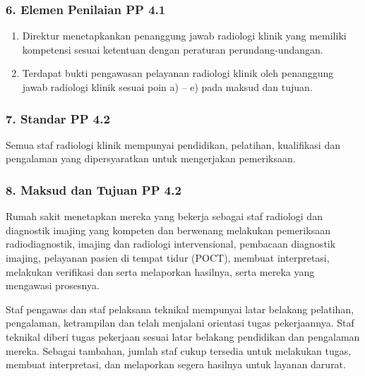 \documentclass[
]{book}
\providecommand{\tightlist}{%
  \setlength{\itemsep}{0pt}\setlength{\parskip}{0pt}}
\begin{document}
\hypertarget{elemen-penilaian-pp-4.1}{%
\subsubsection*{6. Elemen Penilaian PP 4.1}\label{elemen-penilaian-pp-4.1}}

\begin{enumerate}
\def\labelenumi{\alph{enumi}.}
\tightlist
\item
  Direktur menetapkankan penanggung jawab radiologi klinik yang memiliki kompetensi sesuai ketentuan dengan peraturan perundang-undangan.
\item
  Terdapat bukti pengawasan pelayanan radiologi klinik oleh penanggung jawab radiologi klinik sesuai poin a) -- e) pada maksud dan tujuan.
\end{enumerate}

\hypertarget{standar-pp-4.2}{%
\subsubsection*{7. Standar PP 4.2}\label{standar-pp-4.2}}

Semua staf radiologi klinik mempunyai pendidikan, pelatihan, kualifikasi dan pengalaman yang dipersyaratkan untuk mengerjakan pemeriksaan.

\hypertarget{maksud-dan-tujuan-pp-4.2}{%
\subsubsection*{8. Maksud dan Tujuan PP 4.2}\label{maksud-dan-tujuan-pp-4.2}}

Rumah sakit menetapkan mereka yang bekerja sebagai staf radiologi dan diagnostik imajing yang kompeten dan berwenang melakukan pemeriksaan radiodiagnostik, imajing dan radiologi intervensional, pembacaan diagnostik imajing, pelayanan pasien di tempat tidur (POCT), membuat interpretasi, melakukan verifikasi dan serta melaporkan hasilnya, serta mereka yang mengawasi prosesnya.

Staf pengawas dan staf pelaksana teknikal mempunyai latar belakang pelatihan, pengalaman, ketrampilan dan telah menjalani orientasi tugas pekerjaannya. Staf teknikal diberi tugas pekerjaan sesuai latar belakang pendidikan dan pengalaman mereka. Sebagai tambahan, jumlah staf cukup tersedia untuk melakukan tugas, membuat interpretasi, dan melaporkan segera hasilnya untuk layanan darurat.
\end{document}
